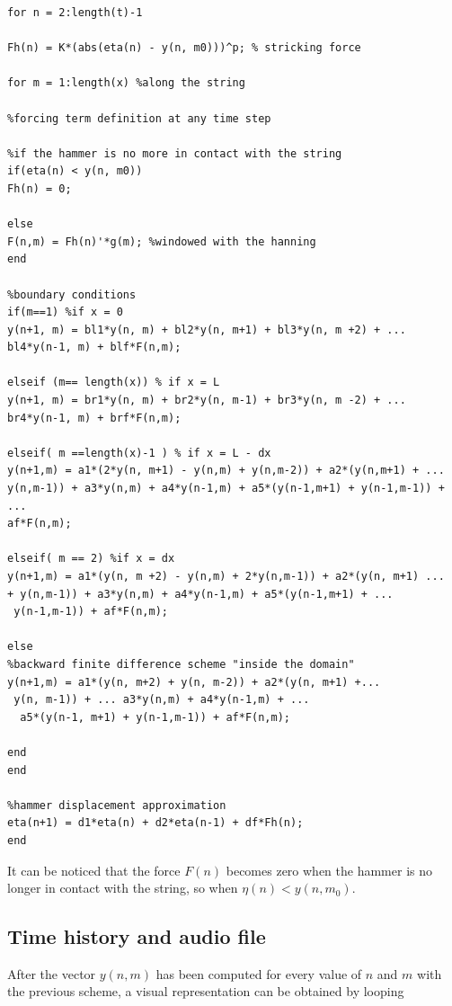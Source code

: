 \documentclass[a4paper]{article}
\begin{document}
 \begin{verbatim}
for n = 2:length(t)-1

Fh(n) = K*(abs(eta(n) - y(n, m0)))^p; % stricking force

for m = 1:length(x) %along the string

%forcing term definition at any time step

%if the hammer is no more in contact with the string
if(eta(n) < y(n, m0)) 
Fh(n) = 0;

else
F(n,m) = Fh(n)'*g(m); %windowed with the hanning
end

%boundary conditions
if(m==1) %if x = 0
y(n+1, m) = bl1*y(n, m) + bl2*y(n, m+1) + bl3*y(n, m +2) + ...
bl4*y(n-1, m) + blf*F(n,m);

elseif (m== length(x)) % if x = L
y(n+1, m) = br1*y(n, m) + br2*y(n, m-1) + br3*y(n, m -2) + ...
br4*y(n-1, m) + brf*F(n,m);

elseif( m ==length(x)-1 ) % if x = L - dx
y(n+1,m) = a1*(2*y(n, m+1) - y(n,m) + y(n,m-2)) + a2*(y(n,m+1) + ...
y(n,m-1)) + a3*y(n,m) + a4*y(n-1,m) + a5*(y(n-1,m+1) + y(n-1,m-1)) + ...
af*F(n,m);

elseif( m == 2) %if x = dx
y(n+1,m) = a1*(y(n, m +2) - y(n,m) + 2*y(n,m-1)) + a2*(y(n, m+1) ...
+ y(n,m-1)) + a3*y(n,m) + a4*y(n-1,m) + a5*(y(n-1,m+1) + ...
 y(n-1,m-1)) + af*F(n,m);

else 
%backward finite difference scheme "inside the domain"
y(n+1,m) = a1*(y(n, m+2) + y(n, m-2)) + a2*(y(n, m+1) +...
 y(n, m-1)) + ... a3*y(n,m) + a4*y(n-1,m) + ...
  a5*(y(n-1, m+1) + y(n-1,m-1)) + af*F(n,m);

end  
end

%hammer displacement approximation
eta(n+1) = d1*eta(n) + d2*eta(n-1) + df*Fh(n);   
end
 \end{verbatim}
 
 It can be noticed that the force $F(n)$ becomes zero when the hammer is no longer in contact with the string, so when $\eta(n) < y(n,m_0)$.
 
 \subsection{Time history and audio file}
 After the vector $y(n,m)$ has been computed for every value of $n$ and $m$ with the previous scheme, a visual representation can be obtained by looping 
 
\printbibliography
\end{document}
